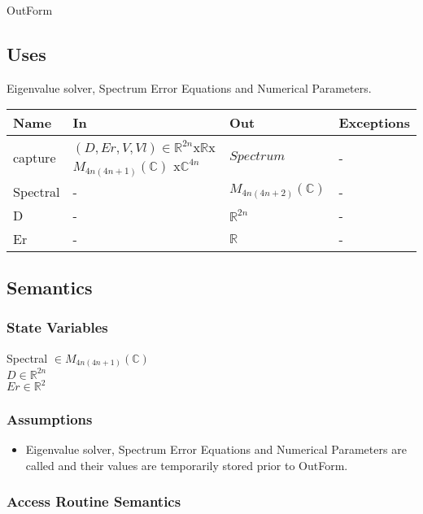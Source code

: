 \documentclass[12pt, titlepage]{article}
\begin{document}
OutForm

\subsection{Uses}

Eigenvalue solver, Spectrum Error Equations and Numerical Parameters. 

\begin{center}
	\begin{tabular}{p{3cm} p{3cm} p{3cm} >{\raggedright\arraybackslash}p{7cm}}
		\toprule
		\textbf{Name} & \textbf{In} & \textbf{Out} & \textbf{Exceptions} \\
		\hline
		capture & $(D,Er,V,Vl) \in
		\mathbb{R}^{2n}$x$\mathbb{R}$x$M_{4n(4n+1)}(\mathbb{C})$
		x$\mathbb{C}^{4n}$ & $Spectrum$ & - \\
		Spectral & - & $M_{4n(4n+2)}(\mathbb{C})$ & - \\
		D & - & $\mathbb{R}^{2n}$ & - \\
		Er & - & $\mathbb{R}$ & - \\
		\hline
	\end{tabular}
\end{center}

\subsection{Semantics}

\subsubsection{State Variables}

Spectral $\in M_{4n(4n+1)}(\mathbb{C})$ \\
$D \in \mathbb{R}^{2n}$ \\
$Er \in \mathbb{R}^{2}$ \\ 

\subsubsection{Assumptions}

\begin{itemize}
	\item Eigenvalue solver, Spectrum Error Equations and Numerical Parameters 
	are called and their values are temporarily stored prior to OutForm.
\end{itemize}

\subsubsection{Access Routine Semantics}
\end{document}
